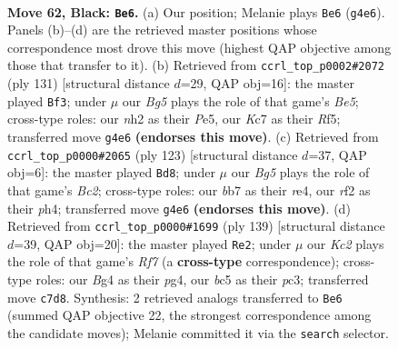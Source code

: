 \documentclass[11pt]{article}
\begin{document}
\clearpage

\begin{figure}[p]\centering
\begin{subfigure}{0.46\textwidth}\centering
\resizebox{\linewidth}{!}{%
\newchessgame
\chessboard[
  setfen={8/1Bk5/8/2B4r/PK4b1/1P5p/5R1N/8 b - - 3 62},
  showmover=false,
  pgfstyle=straightmove, color=movearrow, markmove={g4-e6}
]}
\caption{}
\end{subfigure}\hfill
\begin{subfigure}{0.46\textwidth}\centering
\resizebox{\linewidth}{!}{%
\newchessgame
\chessboard[
  setfen={8/6pk/8/4prBP/4b2K/7P/3R1P2/8 b - - 13 66},
  showmover=false,
  pgfstyle=straightmove, color=movearrow, markmove={e4-f3}
]}
\caption{}
\end{subfigure}
\\[4pt]
\begin{subfigure}{0.46\textwidth}\centering
\resizebox{\linewidth}{!}{%
\newchessgame
\chessboard[
  setfen={8/2b2k2/3r2p1/8/4R2P/1PK5/3B4/8 b - - 10 62},
  showmover=false,
  pgfstyle=straightmove, color=movearrow, markmove={c7-d8}
]}
\caption{}
\end{subfigure}\hfill
\begin{subfigure}{0.46\textwidth}\centering
\resizebox{\linewidth}{!}{%
\newchessgame
\chessboard[
  setfen={8/5p2/5k2/5B2/6P1/1KPR4/5r2/6b1 b - - 4 70},
  showmover=false,
  pgfstyle=straightmove, color=movearrow, markmove={f2-e2}
]}
\caption{}
\end{subfigure}
\caption{\textbf{Move 62, Black: \texttt{Be6}.} (a) Our position; Melanie plays \texttt{Be6} (\texttt{g4e6}). Panels (b)--(d) are the retrieved master positions whose correspondence most drove this move (highest QAP objective among those that transfer to it). (b) Retrieved from \texttt{ccrl\_top\_p0002\#2072} (ply 131) [structural distance $d$=29, QAP obj=16]: the master played \texttt{Bf3}; under $\mu$ our \emph{Bg5} plays the role of that game's \emph{Be5}; cross-type roles: our \emph{n}h2 as their \emph{P}e5, our \emph{K}c7 as their \emph{R}f5; transferred move \texttt{g4e6} \textbf{(endorses this move)}. (c) Retrieved from \texttt{ccrl\_top\_p0000\#2065} (ply 123) [structural distance $d$=37, QAP obj=6]: the master played \texttt{Bd8}; under $\mu$ our \emph{Bg5} plays the role of that game's \emph{Bc2}; cross-type roles: our \emph{b}b7 as their \emph{r}e4, our \emph{r}f2 as their \emph{p}h4; transferred move \texttt{g4e6} \textbf{(endorses this move)}. (d) Retrieved from \texttt{ccrl\_top\_p0000\#1699} (ply 139) [structural distance $d$=39, QAP obj=20]: the master played \texttt{Re2}; under $\mu$ our \emph{Kc2} plays the role of that game's \emph{Rf7} (a \textbf{cross-type} correspondence); cross-type roles: our \emph{B}g4 as their \emph{p}g4, our \emph{b}c5 as their \emph{p}c3; transferred move \texttt{c7d8}. Synthesis: 2 retrieved analogs transferred to \texttt{Be6} (summed QAP objective 22, the strongest correspondence among the candidate moves); Melanie committed it via the \texttt{search} selector.}
\label{fig:thought-m123}
\end{figure}
\end{document}
